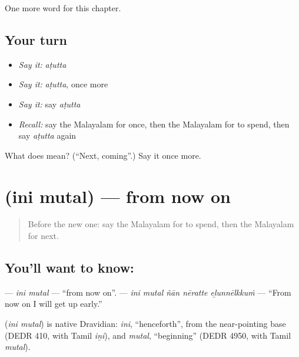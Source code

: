 \begin{grammarlens}[title={What you've built}]
One more word for this chapter.
\end{grammarlens}

\subsection*{Your turn}
\begin{itemize}
\raggedright
  \item \emph{Say it:} \emph{aṭutta}
  \item \emph{Say it:} \emph{aṭutta}, once more
  \item \emph{Say it:} say \emph{aṭutta}
  \item \emph{Recall:} say the Malayalam for once, then the Malayalam for to spend, then say \emph{aṭutta} again
\end{itemize}

\begin{tcolorbox}[breakable,colback=teal!4,colframe=teal!35!black,title={Before you move on}]
What does  mean? (\textquotedblleft{}Next, coming\textquotedblright{}.) Say it once more.
\end{tcolorbox}
\section[\texorpdfstring{\ml{ഇനി} \ml{മുതൽ} (ini mutal)}{ഇനി മുതൽ (ini mutal)}]{  (ini mutal) — from now on}

\label{lesson:ML-C179-ini-mutal}



\begin{quote}
Before the new one: say the Malayalam for to spend, then the Malayalam for next.
\end{quote}

\subsection*{You'll want to know:  }
\textbf{ } — \emph{ini mutal} — \textquotedblleft{}from now on\textquotedblright{}. \textbf{    } — \emph{ini mutal ñān nēratte eḻunnēlkkuṁ} — \textquotedblleft{}From now on I will get up early.\textquotedblright{}

\begin{cousinweb}
\textbf{ } (\emph{ini mutal}) is native Dravidian: \emph{ini}, \textquotedblleft{}henceforth\textquotedblright{}, from the near-pointing base (DEDR 410, with Tamil \emph{iṉi}), and \emph{mutal}, \textquotedblleft{}beginning\textquotedblright{} (DEDR 4950, with Tamil \emph{mutal}).
\end{cousinweb}

